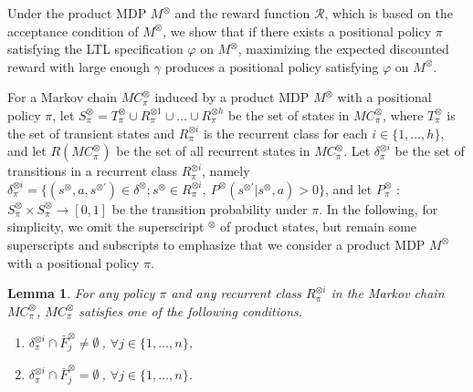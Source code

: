 \documentclass[letterpaper, 10 pt, conference]{ieeeconf}  %
\newtheorem{lemma}{Lemma}
\begin{document}
Under the product MDP $M^{\otimes}$ and the reward function $\mathcal{R}$, which is based on the acceptance condition of $ M^\otimes $, we show that if there exists a positional policy $\pi$ satisfying the LTL specification $\varphi$ on $M^{\otimes}$, maximizing the expected discounted reward with large enough $\gamma$ produces a positional policy satisfying $\varphi$ on $M^{\otimes}$.

For a Markov chain $MC^{\otimes}_{\pi}$ induced by a product MDP $M^{\otimes}$ with a positional policy $\pi$, let $S^{\otimes}_{\pi}= T^{\otimes}_{\pi} \cup R^{\otimes 1}_{\pi} \cup \ldots \cup R^{\otimes h}_{\pi}$ be the set of states in $MC^{\otimes}_{\pi}$, where $T^{\otimes}_{\pi}$ is the set of transient states and $R^{\otimes i}_{\pi}$ is the recurrent class for each $i \in \{ 1, \ldots ,h \}$, and let $R(MC^{\otimes}_{\pi})$ be the set of all recurrent states in $MC^{\otimes}_{\pi}$. Let $\delta^{\otimes i}_{\pi}$ be the set of transitions in a recurrent class $R^{\otimes i}_{\pi}$, namely $\delta^{\otimes i}_{\pi} = \{ (s^{\otimes},a,s^{\otimes \prime}) \in \delta^{\otimes} ; s^{\otimes} \in R^{\otimes i}_{\pi},\ P^{\otimes}(s^{\otimes \prime}|s^{\otimes},a) > 0 \}$, and let $P^{\otimes}_{\pi}$ : $S^{\otimes}_{\pi} \times S^{\otimes}_{\pi} \rightarrow [0,1]$ be the transition probability under $\pi$. In the following, for simplicity, we omit the supersciript $^\otimes$ of product states, but remain some superscripts and subscripts to emphasize that we consider a product MDP $M^{\otimes}$ with a positional policy $\pi$.

\begin{lemma}
  For any policy $\pi$ and any recurrent class $R^{\otimes i}_{\pi}$ in the Markov chain $MC^{\otimes}_{\pi}$,
  $MC^{\otimes}_{\pi}$ satisfies one of the following conditions.
  \vspace{2mm}
  \begin{enumerate}
    \item $\delta^{\otimes i}_{\pi} \cap \bar{F}^{\otimes}_j \neq \emptyset\ $, $ \forall j \in \{ 1, \ldots ,n \}$,
    \item $\delta^{\otimes i}_{\pi} \cap \bar{F}^{\otimes}_j = \emptyset\ $, $ \forall j \in \{ 1, \ldots ,n \}$.
  \end{enumerate}
  \label{lemma1}
\end{lemma}
\end{document}
